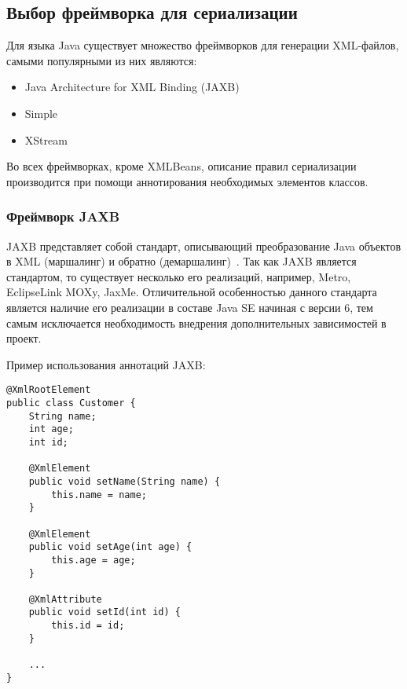 \subsection{Выбор фреймворка для сериализации}

Для языка Java существует множество фреймворков для генерации XML-файлов,
самыми популярными из них являются:


\begin{itemize}
    \item Java Architecture for XML Binding (JAXB)
    \item Simple
    \item XStream
\end{itemize}

Во всех фреймворках, кроме XMLBeans, описание правил сериализации производится
при помощи аннотирования необходимых элементов классов.

\subsubsection{Фреймворк JAXB}

JAXB представляет собой стандарт, описывающий преобразование Java объектов в XML
(маршалинг) и обратно (демаршалинг)~\cite{jaxb}. Так как JAXB является
стандартом, то существует несколько его реализаций, например, Metro, EclipseLink
MOXy, JaxMe. Отличительной особенностью данного стандарта является наличие его
реализации в составе Java SE начиная с  версии 6, тем самым исключается
необходимость внедрения дополнительных зависимостей в проект.

Пример использования аннотаций JAXB:

\begin{lstlisting}[caption={Пример использования фреймворка JAXB}]
@XmlRootElement
public class Customer {
    String name;
    int age;
    int id;

    @XmlElement
    public void setName(String name) {
        this.name = name;
    }

    @XmlElement
    public void setAge(int age) {
        this.age = age;
    }

    @XmlAttribute
    public void setId(int id) {
        this.id = id;
    }

    ...
}
\end{lstlisting}

